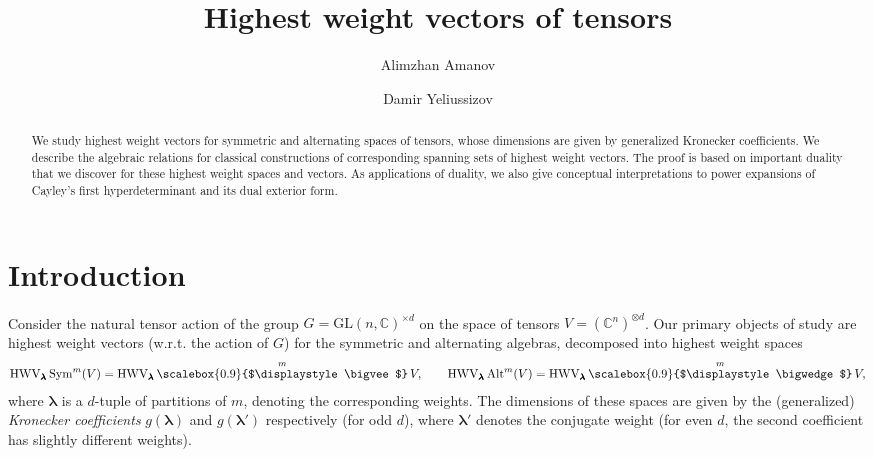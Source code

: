 \documentclass[12pt, reqno]{amsart}
\title[Highest weight vectors of tensors]
{Highest weight vectors of tensors}
\author[Alimzhan Amanov \and Damir Yeliussizov]{Alimzhan Amanov \and Damir Yeliussizov}
\theoremstyle{definition}
\let\oldbigwedge\bigwedge
\let\oldbigvee\bigvee
\renewcommand{\bigwedge}{
  \mathop{
    \vcenter{
      \hbox{\scalebox{0.9}{$\displaystyle\oldbigwedge$}}
    }
  }
}
\renewcommand{\bigvee}{
  \mathop{
    \vcenter{
      \hbox{\scalebox{0.9}{$\displaystyle\oldbigvee$}}
    }
  }
}
\begin{document}
\maketitle

\begin{abstract}
	We study highest weight vectors for symmetric and alternating spaces of tensors, whose dimensions are given by generalized Kronecker coefficients. 
	We describe the algebraic relations for classical constructions of corresponding spanning sets of highest weight vectors. 
	The proof is based on important %
	duality that we discover for these highest weight spaces and vectors. 
	As applications of duality, we also give conceptual interpretations to power expansions of Cayley's first hyperdeterminant and its dual exterior form. 
\end{abstract}

\tableofcontents

\section{Introduction}
    Consider the natural tensor action of the group $G = \mathrm{GL}(n, \mathbb{C})^{\times d}$ on the space of tensors $V = (\mathbb{C}^n)^{\otimes d}$. Our primary objects of study are highest weight vectors (w.r.t. the action of $G$) for the symmetric and alternating algebras, decomposed into highest weight spaces  
\begin{align}\label{eq1}
\mathrm{HWV}_{\pmb{\lambda}}\, \mathrm{Sym}^m(V) = \mathrm{HWV}_{\pmb{\lambda}} \bigvee^m V, %
\qquad \mathrm{HWV}_{\pmb{\lambda}}\, \mathrm{Alt}^m(V) = \mathrm{HWV}_{\pmb{\lambda}} \bigwedge^m V, 
\end{align}
where $\pmb{\lambda}$ is a $d$-tuple of partitions of $m$, denoting the corresponding weights. 
The dimensions of these spaces are given by the (generalized) {\it Kronecker coefficients} $g(\pmb{\lambda})$ and $g(\pmb{\lambda'})$ respectively (for odd $d$), where $\pmb{\lambda'}$ denotes the conjugate weight (for even $d$, the second coefficient has slightly different weights).
\end{document}
